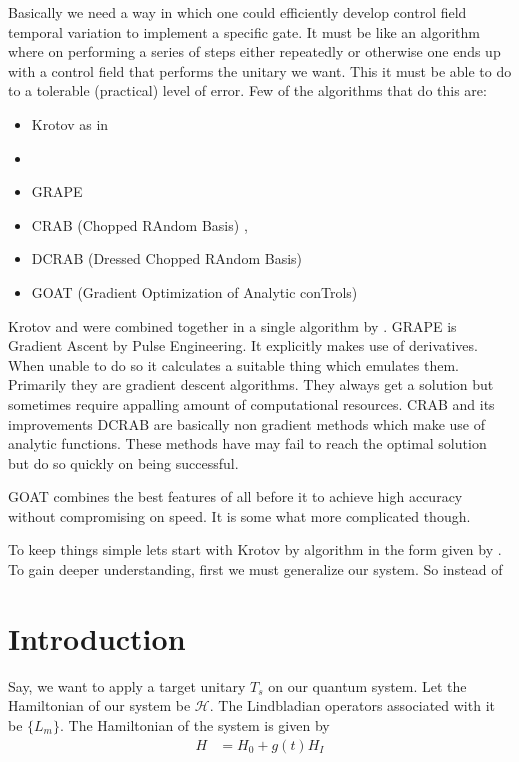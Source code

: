 \par
Basically we need a way in which one could efficiently develop control field temporal variation to implement a specific gate.  It must be like an algorithm where on performing a series of steps either repeatedly or otherwise one ends up with a control field that performs the unitary we want. This it must be able to do to a tolerable (practical) level of error. Few of the algorithms that do this are:
\begin{itemize}
    \item Krotov as in \cite{tannor1992control}
    \item \cite{zhu1998rapid}
    \item GRAPE  \cite{khaneja2005optimal}
    \item CRAB (Chopped RAndom Basis) \cite{doria}, \cite{caneva2011chopped}
    \item DCRAB (Dressed Chopped RAndom Basis) \cite{rach2015dressing}
    \item GOAT (Gradient Optimization of Analytic conTrols) \cite{machnes2015gradient}
\end{itemize}
\par
Krotov \citep{tannor1992control} and \citep{zhu1998rapid} were combined together in a single algorithm by \citep{maday2003new}.   GRAPE \citep{khaneja2005optimal} is Gradient Ascent by Pulse Engineering. It explicitly makes use of derivatives. When unable to do so it calculates a suitable thing which emulates them. Primarily they are gradient descent algorithms. They always get a solution but sometimes require appalling amount of computational resources. CRAB and its improvements DCRAB \citep{rach2015dressing} are basically non gradient methods which make use of analytic functions. These methods have may fail to reach the optimal solution but do so quickly on being successful.
\par
GOAT  \citep{machnes2015gradient} combines the best features of all before it to achieve high accuracy without compromising on speed. It is some what more complicated though.
\par
To keep things simple lets start with Krotov by \citep{tannor1992control} algorithm in the form given by  \citep{maday2003new}. To gain deeper understanding, first we must generalize our system. So instead of   

   





\section{Introduction}
 Say, we want to apply a target unitary $T_{s} $ on our quantum system. Let the Hamiltonian of our system be $\mathcal{H} $. The Lindbladian operators associated with it be $\{ L_{m} \}$. The Hamiltonian of the system is given by 
\begin{align}\label{Hamiltonian form}
    H &= H_{0} + g(t) H_{I} 
\end{align}

